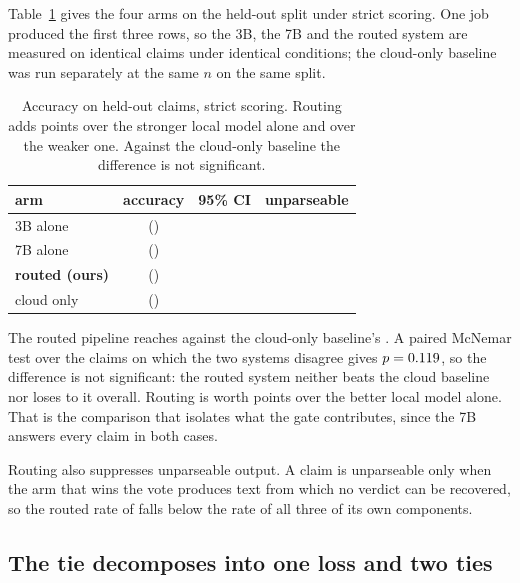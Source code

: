 \documentclass{article}
\begin{document}
Table~\ref{tab:headline} gives the four arms on the held-out split under strict scoring.
One job produced the first three rows, so the 3B, the 7B and the routed system are measured
on identical claims under identical conditions; the cloud-only baseline was run separately
at the same $n$ on the same split.

\begin{table}[t]
\caption{Accuracy on \nTest{} held-out claims, strict scoring. Routing adds
\gainOverSevenB{} points over the stronger local model alone and \gainOverThreeB{} over the
weaker one. Against the cloud-only baseline the difference is not significant.}
\label{tab:headline}
\centering
\begin{tabular}{lccc}
\toprule
arm & accuracy & 95\% CI & unparseable \\
\midrule
3B alone                       & \accThreeB{} (\accThreeBcount{})   & \accThreeBci{} & \unparseThreeB{} \\
7B alone                       & \accSevenB{} (\accSevenBcount{})   & \accSevenBci{} & \unparseSevenB{} \\
\textbf{routed (ours)}         & \textbf{\accRouted{}} (\accRoutedcount{}) & \accRoutedci{} & \unparseRouted{} \\
cloud only                     & \accCloud{} (\accCloudcount{})     & \accCloudci{} & \unparseCloud{} \\
\bottomrule
\end{tabular}
\end{table}

The routed pipeline reaches \accRouted{} against the cloud-only baseline's \accCloud{}. A
paired McNemar test over the \mcnemarAllDisagree{} claims on which the two systems disagree
gives $p = 0.119{}$, so the difference is not significant: the routed system neither
beats the cloud baseline nor loses to it overall. Routing is worth \gainOverSevenB{} points
over the better local model alone. That is the comparison that isolates what the gate
contributes, since the 7B answers every claim in both cases.

Routing also suppresses unparseable output. A claim is unparseable only when the arm that
wins the vote produces text from which no verdict can be recovered, so the routed rate of
\unparseRouted{} falls below the rate of all three of its own components.

\subsection{The tie decomposes into one loss and two ties}
\label{sec:ie}
\end{document}
